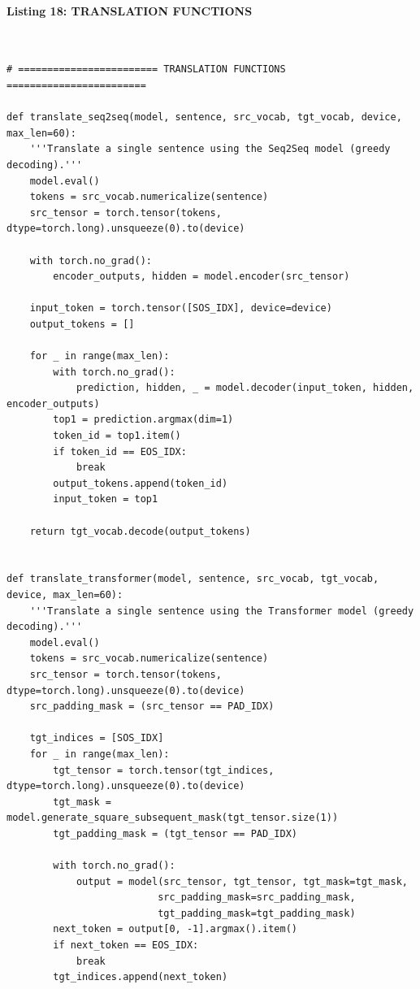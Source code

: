 \documentclass[12pt,a4paper,oneside]{report}
\begin{document}
\paragraph{Listing 18: TRANSLATION FUNCTIONS}\mbox{}\\[-1ex]
\begin{Verbatim}[commandchars=\\\{\},breaklines=true,breakanywhere=true,fontsize=\scriptsize,frame=leftline,framesep=2mm,rulecolor=\color{gray}]
# ======================== TRANSLATION FUNCTIONS ========================

def translate_seq2seq(model, sentence, src_vocab, tgt_vocab, device, max_len=60):
    '''Translate a single sentence using the Seq2Seq model (greedy decoding).'''
    model.eval()
    tokens = src_vocab.numericalize(sentence)
    src_tensor = torch.tensor(tokens, dtype=torch.long).unsqueeze(0).to(device)

    with torch.no_grad():
        encoder_outputs, hidden = model.encoder(src_tensor)

    input_token = torch.tensor([SOS_IDX], device=device)
    output_tokens = []

    for _ in range(max_len):
        with torch.no_grad():
            prediction, hidden, _ = model.decoder(input_token, hidden, encoder_outputs)
        top1 = prediction.argmax(dim=1)
        token_id = top1.item()
        if token_id == EOS_IDX:
            break
        output_tokens.append(token_id)
        input_token = top1

    return tgt_vocab.decode(output_tokens)


def translate_transformer(model, sentence, src_vocab, tgt_vocab, device, max_len=60):
    '''Translate a single sentence using the Transformer model (greedy decoding).'''
    model.eval()
    tokens = src_vocab.numericalize(sentence)
    src_tensor = torch.tensor(tokens, dtype=torch.long).unsqueeze(0).to(device)
    src_padding_mask = (src_tensor == PAD_IDX)

    tgt_indices = [SOS_IDX]
    for _ in range(max_len):
        tgt_tensor = torch.tensor(tgt_indices, dtype=torch.long).unsqueeze(0).to(device)
        tgt_mask = model.generate_square_subsequent_mask(tgt_tensor.size(1))
        tgt_padding_mask = (tgt_tensor == PAD_IDX)

        with torch.no_grad():
            output = model(src_tensor, tgt_tensor, tgt_mask=tgt_mask,
                          src_padding_mask=src_padding_mask,
                          tgt_padding_mask=tgt_padding_mask)
        next_token = output[0, -1].argmax().item()
        if next_token == EOS_IDX:
            break
        tgt_indices.append(next_token)


\end{Verbatim}
\end{document}
